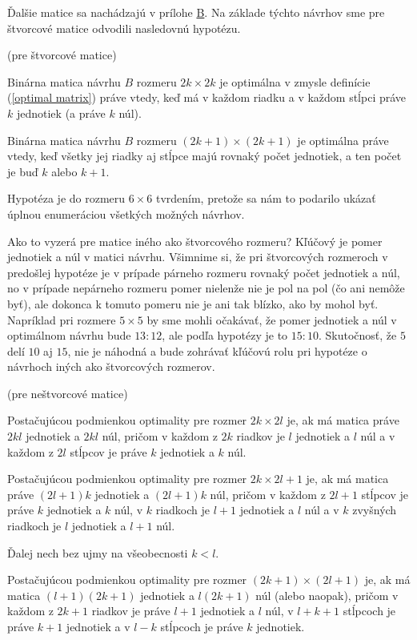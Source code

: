Ďalšie matice sa nachádzajú v prílohe \hyperref[appendix:b]{B}. Na základe týchto návrhov sme pre štvorcové matice odvodili nasledovnú hypotézu.

\begin{hypoteza}
\label{hypoteza1}
(pre štvorcové matice)

Binárna matica návrhu $B$ rozmeru $2k \times 2k$ je optimálna v zmysle definície (\ref{optimal matrix}) práve vtedy, 
keď má v každom riadku a v každom stĺpci práve $k$ jednotiek (a práve $k$ núl).

Binárna matica návrhu $B$ rozmeru $(2k + 1) \times (2k + 1)$ je optimálna práve vtedy, 
keď všetky jej riadky aj stĺpce majú rovnaký počet jednotiek, a ten počet je buď $k$ alebo $k + 1$.
\end{hypoteza}

\begin{com}
Hypotéza je do rozmeru $6 \times 6$ tvrdením, pretože sa nám to podarilo ukázať úplnou enumeráciou všetkých možných návrhov.
\end{com}

Ako to vyzerá pre matice iného ako štvorcového rozmeru? 
Kľúčový je pomer jednotiek a núl v matici návrhu. 
Všimnime si, že pri štvorcových rozmeroch v predošlej hypotéze je v prípade párneho rozmeru rovnaký počet jednotiek a núl, 
no v prípade nepárneho rozmeru pomer nielenže nie je pol na pol (čo ani nemôže byť), 
ale dokonca k tomuto pomeru nie je ani tak blízko, ako by mohol byť. 
Napríklad pri rozmere $5 \times 5$ by sme mohli očakávať, že pomer jednotiek a núl v optimálnom návrhu bude $13:12$, 
ale podľa hypotézy je to $15:10$. Skutočnosť, že $5$ delí $10$ aj $15$, nie je náhodná
a bude zohrávať kľúčovú rolu pri hypotéze o návrhoch iných ako štvorcových rozmerov.

\begin{hypoteza}
\label{hypoteza2}
(pre neštvorcové matice)

Postačujúcou podmienkou optimality pre rozmer $2k \times 2l$ je, ak má matica práve $2kl$ jednotiek a $2kl$ núl, 
pričom v každom z $2k$ riadkov je $l$ jednotiek a $l$ núl a v každom z $2l$ stĺpcov je práve $k$ jednotiek a $k$ núl.

Postačujúcou podmienkou optimality pre rozmer $2k \times 2l + 1$ je, ak má matica práve $(2l + 1)k$ jednotiek a $(2l + 1)k$ núl, 
pričom v každom z $2l + 1$ stĺpcov je práve $k$ jednotiek a $k$ núl, v $k$ riadkoch je $l + 1$ jednotiek a $l$ núl 
a v $k$ zvyšných riadkoch je $l$ jednotiek a $l + 1$ núl.

Ďalej nech bez ujmy na všeobecnosti $k < l$.

Postačujúcou podmienkou optimality pre rozmer $(2k + 1) \times (2l + 1)$ je, 
ak má matica $(l + 1)(2k + 1)$ jednotiek a $l(2k + 1)$ núl (alebo naopak), 
pričom v každom z $2k + 1$ riadkov je práve $l + 1$ jednotiek a $l$ núl, v $l + k + 1$ stĺpcoch je práve $k + 1$
jednotiek a v $l - k$ stĺpcoch je práve $k$ jednotiek.
\end{hypoteza}

